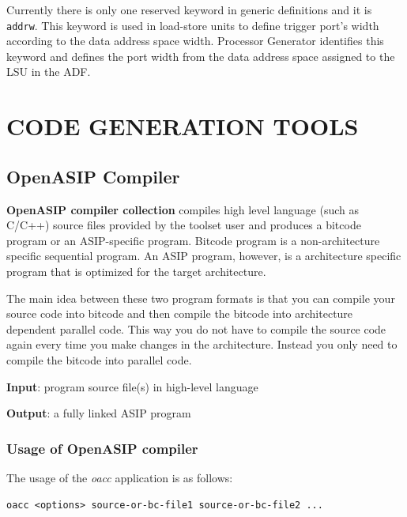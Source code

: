 \documentclass[a4paper,twoside]{tceusermanual}
\begin{document}
Currently there is only one reserved keyword in generic definitions and it is
\verb|addrw|. This keyword is used in load-store units to define trigger
port's width according to the data address space width. Processor Generator
identifies this keyword and defines the port width from the data address space
assigned to the LSU in the ADF.


\chapter{CODE GENERATION TOOLS}

\section{OpenASIP Compiler}
\label{sec:frontend}

\textbf{OpenASIP compiler collection} compiles high level language (such as
C/C++) source files provided by the toolset user and produces a bitcode
program or an ASIP-specific program. Bitcode program is a non-architecture
specific sequential program. An ASIP program, however, is
a architecture specific program that is optimized for the target architecture.

The main idea between these two program formats is that you can compile your
source code into bitcode and then compile the bitcode into architecture
dependent parallel code. This way you do not have to compile the source code
again every time you make changes in the architecture. Instead you only need
to compile the bitcode into parallel code.

\textbf{Input}: program source file(s) in high-level language

\textbf{Output}: a fully linked ASIP program

\subsection{Usage of OpenASIP compiler}

The usage of the \emph{oacc} application is as follows:

\begin{verbatim}
oacc <options> source-or-bc-file1 source-or-bc-file2 ...
\end{verbatim}
\end{document}
